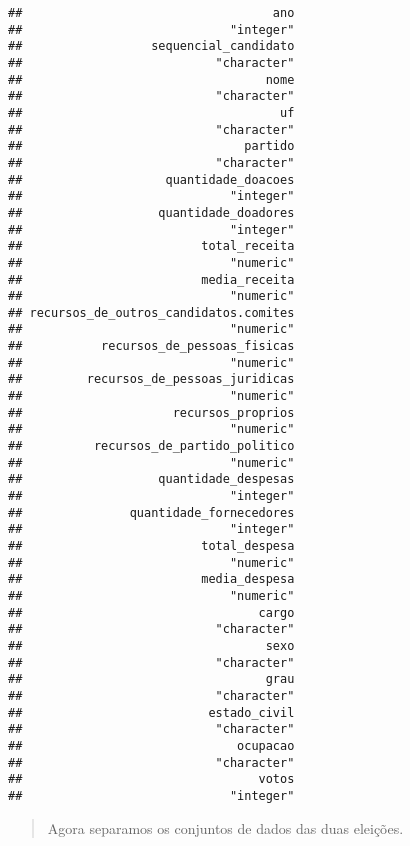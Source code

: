 \documentclass[]{article}
\newenvironment{Shaded}{\begin{snugshade}}{\end{snugshade}}
\newcommand{\KeywordTok}[1]{\textcolor[rgb]{0.13,0.29,0.53}{\textbf{#1}}}
\newcommand{\DecValTok}[1]{\textcolor[rgb]{0.00,0.00,0.81}{#1}}
\newcommand{\StringTok}[1]{\textcolor[rgb]{0.31,0.60,0.02}{#1}}
\newcommand{\OperatorTok}[1]{\textcolor[rgb]{0.81,0.36,0.00}{\textbf{#1}}}
\newcommand{\NormalTok}[1]{#1}
\begin{document}
\begin{verbatim}
##                                   ano 
##                             "integer" 
##                  sequencial_candidato 
##                           "character" 
##                                  nome 
##                           "character" 
##                                    uf 
##                           "character" 
##                               partido 
##                           "character" 
##                    quantidade_doacoes 
##                             "integer" 
##                   quantidade_doadores 
##                             "integer" 
##                         total_receita 
##                             "numeric" 
##                         media_receita 
##                             "numeric" 
## recursos_de_outros_candidatos.comites 
##                             "numeric" 
##           recursos_de_pessoas_fisicas 
##                             "numeric" 
##         recursos_de_pessoas_juridicas 
##                             "numeric" 
##                     recursos_proprios 
##                             "numeric" 
##          recursos_de_partido_politico 
##                             "numeric" 
##                   quantidade_despesas 
##                             "integer" 
##               quantidade_fornecedores 
##                             "integer" 
##                         total_despesa 
##                             "numeric" 
##                         media_despesa 
##                             "numeric" 
##                                 cargo 
##                           "character" 
##                                  sexo 
##                           "character" 
##                                  grau 
##                           "character" 
##                          estado_civil 
##                           "character" 
##                              ocupacao 
##                           "character" 
##                                 votos 
##                             "integer"
\end{verbatim}

\begin{quote}
Agora separamos os conjuntos de dados das duas eleições.
\end{quote}

\begin{Shaded}
\end{Shaded}
\end{document}
